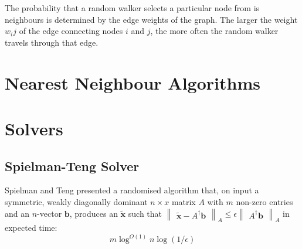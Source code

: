 The probability that a random walker selects a particular node from is 
neighbours is determined by the edge weights of the graph. The larger the weight
${w_ij}$ of the edge connecting nodes $i$ and $j$, the more often the random 
walker travels through that edge.

\section{Nearest Neighbour Algorithms}
\label{sec:nearestNeighbourAlgorithms}

\section{Solvers}
\label{sec:solvers}

\subsection{Spielman-Teng Solver}
\label{sec:spielmanTengSolver}
\nocite{Spielman:2006}
Spielman and Teng presented a randomised algorithm that, on input a symmetric, 
weakly diagonally dominant $n{\times}x$ matrix $A$ with $m$ non-zero entries and
an $n$-vector $\mathbf{b}$, produces an $\tilde{\mathbf{x}}$ such that 
$\begin{Vmatrix} \tilde{\textbf{x}} - A^{\dagger}\textbf{b} \end{Vmatrix}_{A} 
\leq \epsilon \begin{Vmatrix} A^{\dagger}\mathbf{b} \end{Vmatrix}_{A}$ in 
expected time:
\begin{displaymath}
m \log^{O(1)} n \log (1/\epsilon)
\end{displaymath}
